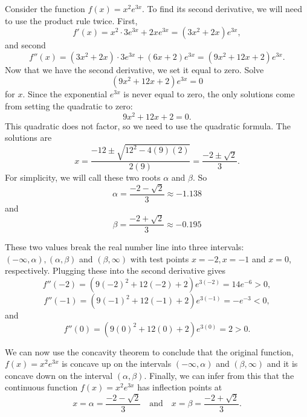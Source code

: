 \documentclass{ximera}
\begin{document}
\begin{example}[example 6]
Consider the function $f(x) = x^2e^{3x}$.  To find its second derivative, 
we will need to use the product rule twice. First, 
\[f'(x) = x^2 \cdot 3e^{3x} + 2xe^{3x} = (3x^2 + 2x)e^{3x},\]
and second
\[f''(x) = (3x^2 + 2x)\cdot 3e^{3x} + (6x + 2)e^{3x} = (9x^2 + 12x + 2)e^{3x}.\]
Now that we have the second derivative, we set it equal to zero.  Solve
\[(9x^2 + 12x + 2)e^{3x}=0\]
for $x$.
Since the exponential $e^{3x}$ is never equal to zero, the only solutions come from setting the quadratic to zero:
\[9x^2 + 12x + 2=0.\]
This quadratic does not factor, so we need to use the quadratic formula.
The solutions are 
\[x = \frac{-12 \pm \sqrt{12^2 - 4(9)(2)}}{2(9)} = \frac{-2 \pm \sqrt{2}}{3}.\]
For simplicity, we will call these two roots $\alpha$ and $\beta$.
So 
\[\alpha = \frac{-2 - \sqrt{2}}{3} \approx -1.138\]
and
\[\beta = \frac{-2 + \sqrt{2}}{3} \approx -0.195\]

These two values break the real number line into three intervals: $(-\infty, \alpha), 
(\alpha, \beta)$ and $(\beta, \infty)$ with test points
$x = -2, x = -1$ and $x = 0$, respectively.
Plugging these into the second derivative gives
\[f''(-2) = (9(-2)^2 + 12(-2) + 2)e^{3(-2)} = 14e^{-6} > 0,\]
\[f''(-1) = (9(-1)^2 + 12(-1) + 2)e^{3(-1)} = -e^{-3} < 0,\]
and
\[f''(0) = (9(0)^2 + 12(0) + 2)e^{3(0)} = 2 > 0.\]

\begin{image}
\end{image}
We can now use the concavity theorem to conclude that
the original function, $f(x) = x^2 e^{3x}$ is concave up on the intervals $(-\infty, \alpha)$ 
and $(\beta, \infty)$ and it is concave down on the interval 
$(\alpha, \beta)$.
Finally, we can infer from this that the continuous function $f(x) = x^2 e^{3x}$ has inflection points at 
\[
x = \alpha= \dfrac{-2 - \sqrt{2}}{3} \quad \text{and} \quad x = \beta = \dfrac{-2 + \sqrt{2}}{3}.
\]


\end{example}
\end{document}
